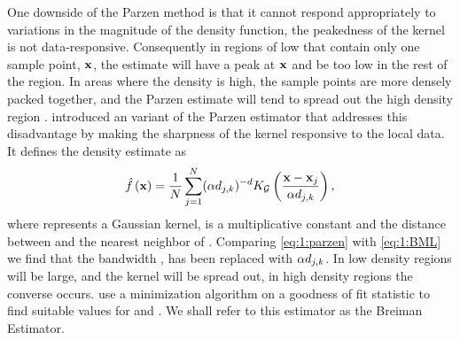One downside of the Parzen method is that it cannot respond appropriately to variations in the magnitude of the density function, \ie the peakedness of the kernel is not data-responsive. Consequently in regions of low \varDensityFunction{\varPattern} that contain only one sample point, $\varPattern$, the estimate will have a peak at $\varPattern$ and be too low in the rest of the region. In areas where the density is high, the sample points are more densely packed together, and the Parzen estimate will tend to spread out the high density region \cite{breiman1977variable}. \citeauthor{breiman1977variable} introduced an variant of the Parzen estimator that addresses this disadvantage by making the sharpness of the kernel responsive to the local data. It defines the density estimate as
\begin{equation}\label{eq:1:BML}
 	\varEstimatedDensityFunction{\varPattern} = \frac{1}{\varNumPatterns} \sum_{j = 1}^{\varNumPatterns} (\varBMLconstant \varKNNDistance{j}{k})^{-\varDim} \varKernel[\varGaussian]{\frac{\varPattern - \varPattern[j]}{\varBMLconstant \varKNNDistance{j}{k}}},
\end{equation} 
%
where \varKernel[\varGaussian]{\cdot} represents a Gaussian kernel, \varBMLconstant is a multiplicative constant and  the distance between \varPattern[j] and the \KNNK nearest neighbor of \varPattern[j]. Comparing \cref{eq:1:parzen} with \eqref{eq:1:BML} we find that the bandwidth \varBandwidth, has been replaced with $\alpha d_{j, k}$.  In low density regions  will be large, and the kernel will be spread out, in high density regions the converse occurs. \citeauthor{breiman1977variable} use a minimization algorithm on a goodness of fit statistic to find suitable values for \KNNK and \varBMLconstant. We shall refer to this estimator as the Breiman Estimator. 

